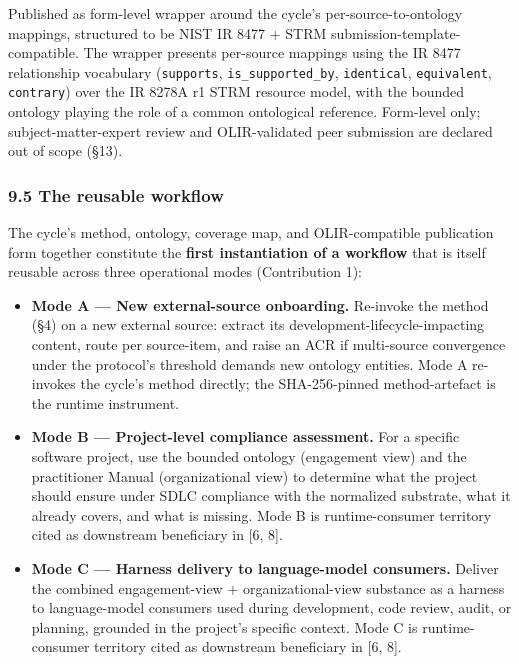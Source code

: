 \documentclass[
]{article}
\providecommand{\tightlist}{%
  \setlength{\itemsep}{0pt}\setlength{\parskip}{0pt}}
\begin{document}
Published as form-level wrapper around the cycle's
per-source-to-ontology mappings, structured to be NIST IR 8477 + STRM
submission-template-compatible. The wrapper presents per-source mappings
using the IR 8477 relationship vocabulary (\texttt{supports},
\texttt{is\_supported\_by}, \texttt{identical}, \texttt{equivalent},
\texttt{contrary}) over the IR 8278A r1 STRM resource model, with the
bounded ontology playing the role of a common ontological reference.
Form-level only; subject-matter-expert review and OLIR-validated peer
submission are declared out of scope (§13).

\subsubsection{9.5 The reusable workflow}\label{the-reusable-workflow}

The cycle's method, ontology, coverage map, and OLIR-compatible
publication form together constitute the \textbf{first instantiation of
a workflow} that is itself reusable across three operational modes
(Contribution 1):

\begin{itemize}
\tightlist
\item
  \textbf{Mode A --- New external-source onboarding.} Re-invoke the
  method (§4) on a new external source: extract its
  development-lifecycle-impacting content, route per source-item, and
  raise an ACR if multi-source convergence under the protocol's
  threshold demands new ontology entities. Mode A re-invokes the cycle's
  method directly; the SHA-256-pinned method-artefact is the runtime
  instrument.
\item
  \textbf{Mode B --- Project-level compliance assessment.} For a
  specific software project, use the bounded ontology (engagement view)
  and the practitioner Manual (organizational view) to determine what
  the project should ensure under SDLC compliance with the normalized
  substrate, what it already covers, and what is missing. Mode B is
  runtime-consumer territory cited as downstream beneficiary in {[}6,
  8{]}.
\item
  \textbf{Mode C --- Harness delivery to language-model consumers.}
  Deliver the combined engagement-view + organizational-view substance
  as a harness to language-model consumers used during development, code
  review, audit, or planning, grounded in the project's specific
  context. Mode C is runtime-consumer territory cited as downstream
  beneficiary in {[}6, 8{]}.
\end{itemize}
\end{document}
